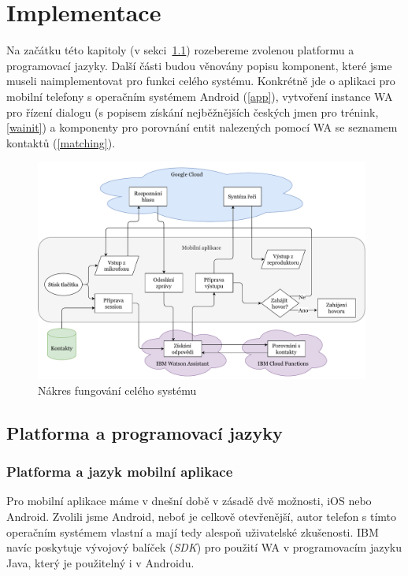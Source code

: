 \chapter{Implementace}

Na začátku této kapitoly (v sekci~\ref{analysis}) rozebereme zvolenou
platformu a programovací jazyky.
Další části budou věnovány popisu komponent, které jsme museli
naimplementovat pro funkci celého systému. Konkrétně jde o aplikaci pro
mobilní telefony s operačním systémem Android (\ref{app}), vytvoření instance WA pro řízení
dialogu (s popisem získání nejběžnějších českých jmen pro trénink, \ref{wainit}) a komponenty
pro porovnání entit nalezených pomocí WA se seznamem kontaktů (\ref{matching}).

\begin{figure}[h]\label{app-flowchart}
    \centering
    \includegraphics[width=0.98\textwidth]{../img/app-flowchart.pdf}
    \caption{Nákres fungování celého systému}
\end{figure}

\section{Platforma a programovací jazyky}\label{analysis}

\subsection{Platforma a jazyk mobilní aplikace}
Pro mobilní aplikace máme v dnešní době v zásadě dvě možnosti, iOS nebo Android.
Zvolili jsme Android, neboť je celkově otevřenější, autor telefon s tímto
operačním systémem vlastní a mají tedy alespoň uživatelské zkušenosti. IBM navíc
poskytuje vývojový balíček (\textit{SDK}) pro použití WA v programovacím
jazyku Java, který je použitelný i v Androidu.

